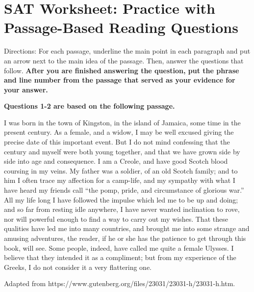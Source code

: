 \section{SAT Worksheet: Practice with Passage-Based Reading Questions}

Directions: For each passage, underline the main point in each paragraph and put an arrow next
to the main idea of the passage. Then, answer the questions that follow. \textbf{After you are finished
answering the question, put the phrase and line number from the passage that served
as your evidence for your answer.}

\textbf{Questions 1-2 are based on the following passage.}

\begin{linenumbers}
\modulolinenumbers[5] 
\indent I was born in the town of Kingston, in the island of Jamaica, some time in the present century. As a female, and a widow, I may be well excused giving the precise date of this important event. But I do not mind confessing that the century and myself were both young together, and that we have grown side by side into age and consequence. I am a Creole, and have good Scotch blood coursing in my veins. My father was a soldier, of an old Scotch family; and to him I often trace my affection for a camp-life, and my sympathy with what I have heard my friends call ``the pomp, pride, and circumstance of glorious war.'' All my life long I have followed the impulse which led me to be up and doing; and so far from resting idle anywhere, I have never wanted inclination to rove, nor will powerful enough to find a way to carry out my wishes. That these qualities have led me into many countries, and brought me into some strange and amusing adventures, the reader, if he or she has the patience to get through this book, will see. Some people, indeed, have called me quite a female Ulysses. I believe that they intended it as a compliment; but from my experience of the Greeks, I do not consider it a very flattering one.
\end{linenumbers}

Adapted from https://www.gutenberg.org/files/23031/23031-h/23031-h.htm. 

